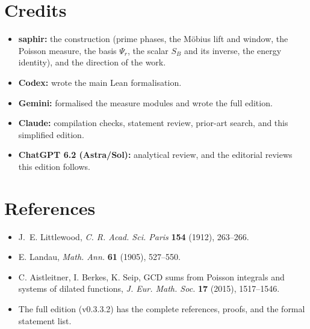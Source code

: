 \documentclass[11pt]{article}
\begin{document}
\section*{Credits}
\begin{itemize}
  \item \textbf{saphir:} the construction (prime phases, the M\"obius lift and window, the Poisson measure, the basis $\Psi_r$, the scalar $S_B$ and its inverse, the energy identity), and the direction of the work.
  \item \textbf{Codex:} wrote the main Lean formalisation.
  \item \textbf{Gemini:} formalised the measure modules and wrote the full edition.
  \item \textbf{Claude:} compilation checks, statement review, prior-art search, and this simplified edition.
  \item \textbf{ChatGPT 6.2 (Astra/Sol):} analytical review, and the editorial reviews this edition follows.
\end{itemize}

\section*{References}
\begin{itemize}
  \item J.~E. Littlewood, \emph{C. R. Acad. Sci. Paris} \textbf{154} (1912), 263--266.
  \item E. Landau, \emph{Math. Ann.} \textbf{61} (1905), 527--550.
  \item C. Aistleitner, I. Berkes, K. Seip, GCD sums from Poisson integrals and systems of dilated functions, \emph{J. Eur. Math. Soc.} \textbf{17} (2015), 1517--1546.
  \item The full edition (v0.3.3.2) has the complete references, proofs, and the formal statement list.
\end{itemize}
\end{document}
